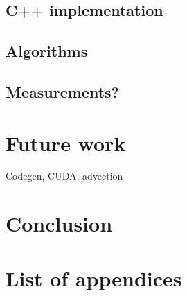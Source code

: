 \documentclass[fontsize=11pt, appendixprefix=true]{scrreprt}
\begin{document}
\section{C++ implementation}
\section{Algorithms}
\section{Measurements?}

\chapter{Future work}

Codegen, CUDA, advection

\chapter{Conclusion}

\printbibliography
\appendix
\chapter{List of appendices}
\end{document}
